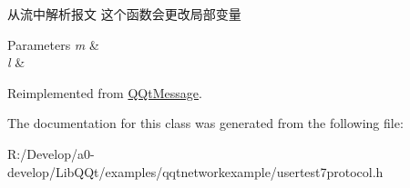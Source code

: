 从流中解析报文 这个函数会更改局部变量 


\begin{DoxyParams}{Parameters}
{\em m} & \\
\hline
{\em l} & \\
\hline
\end{DoxyParams}


Reimplemented from \mbox{\hyperlink{class_q_qt_message_a0bc25669bdd61490b1d8df6d77565f31}{Q\+Qt\+Message}}.



The documentation for this class was generated from the following file\+:\begin{DoxyCompactItemize}
\item 
R\+:/\+Develop/a0-\/develop/\+Lib\+Q\+Qt/examples/qqtnetworkexample/usertest7protocol.\+h\end{DoxyCompactItemize}
